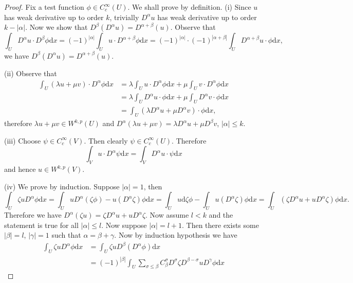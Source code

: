 \begin{proof}
Fix a test function $\phi\in C_c^\infty(U)$. We shall prove by definition.
(i) Since $u$ has weak derivative up to order $k$, trivially $D^\alpha u$ has weak derivative up to order $k-|\alpha|$. Now we show that $D^\beta(D^\alpha u)=D^{\alpha+\beta}(u)$. Observe that 
$$
\int_U{D^{\alpha}u\cdot D^{\beta}\phi \mathrm{d}x}=\left( -1 \right) ^{\left| \alpha \right|}\int_U{u\cdot D^{\alpha +\beta}\phi \mathrm{d}x}=\left( -1 \right) ^{\left| \alpha \right|}\cdot \left( -1 \right) ^{\left| \alpha +\beta \right|}\int_U{D^{\alpha +\beta}u\cdot \phi \mathrm{d}x},
$$
we have $D^\beta(D^\alpha u)=D^{\alpha+\beta}(u)$.\par
(ii) Observe that 
$$
\begin{aligned}
\int_U{\left( \lambda u+\mu v \right) \cdot D^{\alpha}\phi \mathrm{d}x}&=\lambda \int_U{u\cdot D^{\alpha}\phi \mathrm{d}x}+\mu \int_U{v\cdot D^{\alpha}\phi \mathrm{d}x}
\\
&=\lambda \int_U{D^{\alpha}u\cdot \phi \mathrm{d}x}+\mu \int_U{D^{\alpha}v\cdot \phi \mathrm{d}x}
\\
&=\int_U{\left( \lambda D^{\alpha}u+\mu D^{\alpha}v \right) \cdot \phi \mathrm{d}x},
\end{aligned}
$$
therefore $\lambda u+\mu v\in W^{k,p}(U)$ and $D^{\alpha}(\lambda u+\mu v)=\lambda D^{\alpha}u+\mu D^{\beta}v$, $|\alpha|\le k$.\par
(iii) Choose $\psi\in C_c^\infty(V)$. Then clearly $\psi\in C_c^\infty(U)$. Therefore 
$$
\int_V{u\cdot D^{\alpha}\psi \mathrm{d}x}=\int_V{D^{\alpha}u\cdot \psi \mathrm{d}x}
$$
and hence $u\in W^{k,p}(V)$.\par
(iv) We prove by induction. Suppose $|\alpha|=1$, then 
$$
\int_U{\zeta uD^{\alpha}\phi \mathrm{d}x}=\int_U{uD^{\alpha}\left( \zeta \phi \right) -u\left( D^{\alpha}\zeta \right) \phi \mathrm{d}x}=\int_U{u\mathrm{d}\zeta \phi}-\int_U{u\left( D^{\alpha}\zeta \right) \phi \mathrm{d}x}=\int_U{\left( \zeta D^{\alpha}u+uD^{\alpha}\zeta \right) \phi \mathrm{d}x}.
$$
Therefore we have $D^\alpha(\zeta u)=\zeta D^\alpha u+uD^\alpha\zeta$. Now assume $l<k$ and the statement is true for all $|\alpha|\le l$. Now suppose $|\alpha|=l+1$. Then there exists some $|\beta|=l$, $|\gamma|=1$ such that $\alpha=\beta+\gamma$. Now by induction hypothesis we have 
$$
\begin{aligned}
\int_U{\zeta uD^{\alpha}\phi \mathrm{d}x}&=\int_U{\zeta uD^{\beta}\left( D^{\alpha}\phi \right) \mathrm{d}x}
\\
&=\left( -1 \right) ^{\left| \beta \right|}\int_U{\sum_{\sigma \le \beta}{C_{\beta}^{\sigma}D^{\sigma}\zeta D^{\beta -\sigma}uD^{\gamma}\phi \mathrm{d}x}}

\end{aligned}$$
\end{proof}
